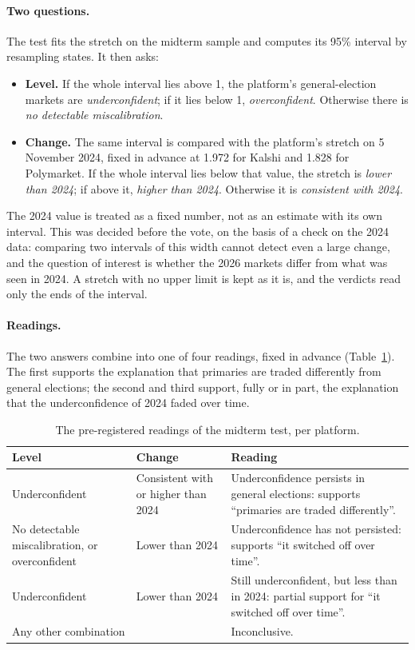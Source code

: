 \paragraph{Two questions.} The test fits the stretch on the midterm sample and computes its 95\% interval by resampling
states. It then asks:
\begin{itemize}
  \item \textbf{Level.} If the whole interval lies above 1, the platform's general-election markets are
        \emph{underconfident}; if it lies below 1, \emph{overconfident}. Otherwise there is \emph{no detectable
        miscalibration}.
  \item \textbf{Change.} The same interval is compared with the platform's stretch on 5 November 2024, fixed in
        advance at 1.972 for Kalshi and 1.828 for Polymarket. If the whole interval lies below that value, the
        stretch is \emph{lower than 2024}; if above it, \emph{higher than 2024}. Otherwise it is \emph{consistent with
        2024}.
\end{itemize}
The 2024 value is treated as a fixed number, not as an estimate with its own interval. This was decided before the vote,
on the basis of a check on the 2024 data: comparing two intervals of this width cannot detect even a large change, and
the question of interest is whether the 2026 markets differ from what was seen in 2024. A stretch with no upper limit is
kept as it is, and the verdicts read only the ends of the interval.

\paragraph{Readings.} The two answers combine into one of four readings, fixed in advance (Table~\ref{tab:readings}).
The first supports the explanation that primaries are traded differently from general elections; the second and third
support, fully or in part, the explanation that the underconfidence of 2024 faded over time.

\begin{table}[t]
\centering\small
\caption{The pre-registered readings of the midterm test, per platform.}\label{tab:readings}
\begin{tabular}{p{4.6cm}p{3.3cm}p{6.2cm}}
\toprule
Level & Change & Reading \\
\midrule
Underconfident & Consistent with or higher than 2024 & Underconfidence persists in general elections: supports ``primaries are traded differently''. \\
No detectable miscalibration, or overconfident & Lower than 2024 & Underconfidence has not persisted: supports ``it switched off over time''. \\
Underconfident & Lower than 2024 & Still underconfident, but less than in 2024: partial support for ``it switched off over time''. \\
Any other combination & & Inconclusive. \\
\bottomrule
\end{tabular}
\end{table}

